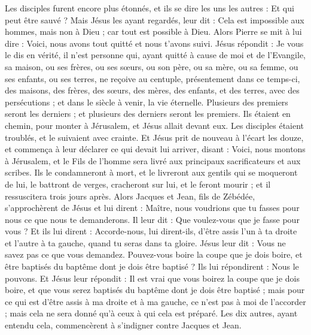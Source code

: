 \begin{multicols}{2}
Les disciples furent encore plus étonnés, et ils se dire les uns les autres : Et qui peut être sauvé ?
Mais Jésus les ayant regardés, leur dit : Cela est impossible aux hommes, mais non à Dieu ; car tout est possible à Dieu.
Alors Pierre se mit à lui dire : Voici, nous avons tout quitté et nous t'avons suivi.
Jésus répondit : Je vous le dis en vérité, il n’est personne qui, ayant quitté à cause de moi et de l’Evangile, sa maison, ou ses frères, ou ses sœurs, ou son père, ou sa mère, ou sa femme, ou ses enfants, ou ses terres,
ne reçoive au centuple, présentement dans ce temps-ci, des maisons, des frères, des sœurs, des mères, des enfants, et des terres, avec des persécutions ; et dans le siècle à venir, la vie éternelle.
Plusieurs des premiers seront les derniers ; et plusieurs des derniers seront les premiers.
Ils étaient en chemin, pour monter à Jérusalem, et Jésus allait devant eux. Les disciples étaient troublés, et le suivaient avec crainte. Et Jésus prit de nouveau à l'écart les douze, et commença à leur déclarer ce qui devait lui arriver,
disant : Voici, nous montons à Jérusalem, et le Fils de l'homme sera livré aux principaux sacrificateurs et aux scribes. Ils le condamneront à mort, et le livreront aux gentils
qui se moqueront de lui, le battront de verges, cracheront sur lui, et le feront mourir ; et il ressuscitera trois jours après.
Alors Jacques et Jean, fils de Zébédée, s’approchèrent de Jésus et lui dirent : Maître, nous voudrions que tu fasses pour nous ce que nous te demanderons.
Il leur dit : Que voulez-vous que je fasse pour vous ?
Et ils lui dirent : Accorde-nous, lui dirent-ils, d’être assis l’un à ta droite et l’autre à ta gauche, quand tu seras dans ta gloire.
Jésus leur dit : Vous ne savez pas ce que vous demandez. Pouvez-vous boire la coupe que je dois boire, et être baptisés du baptême dont je dois être baptisé ?
Ils lui répondirent : Nous le pouvons. Et Jésus leur répondit : Il est vrai que vous boirez la coupe que je dois boire, et que vous serez baptisés du baptême dont je dois être baptisé ;
mais pour ce qui est d'être assis à ma droite et à ma gauche, ce n'est pas à moi de l’accorder ; mais cela ne sera donné qu’à ceux à qui cela est préparé.
Les dix autres, ayant entendu cela, commencèrent à s’indigner contre Jacques et Jean.

\end{multicols}

